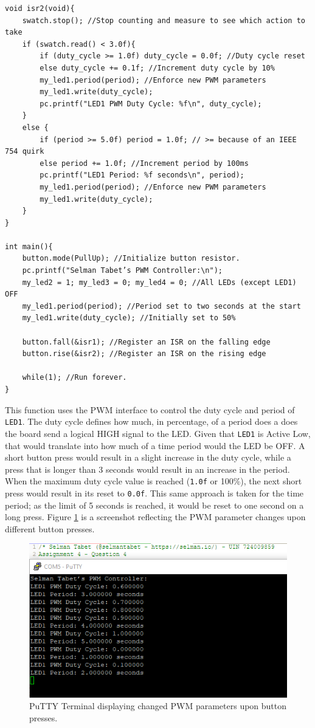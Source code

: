 \documentclass{article}
\begin{document}
\begin{verbatim}
void isr2(void){
    swatch.stop(); //Stop counting and measure to see which action to take
    if (swatch.read() < 3.0f){
        if (duty_cycle >= 1.0f) duty_cycle = 0.0f; //Duty cycle reset
        else duty_cycle += 0.1f; //Increment duty cycle by 10%
        my_led1.period(period); //Enforce new PWM parameters
        my_led1.write(duty_cycle);
        pc.printf("LED1 PWM Duty Cycle: %f\n", duty_cycle);
    }
    else {
        if (period >= 5.0f) period = 1.0f; // >= because of an IEEE 754 quirk
        else period += 1.0f; //Increment period by 100ms
        pc.printf("LED1 Period: %f seconds\n", period);
        my_led1.period(period); //Enforce new PWM parameters
        my_led1.write(duty_cycle);
    }
}

int main(){
    button.mode(PullUp); //Initialize button resistor.
    pc.printf("Selman Tabet’s PWM Controller:\n");
    my_led2 = 1; my_led3 = 0; my_led4 = 0; //All LEDs (except LED1) OFF
    my_led1.period(period); //Period set to two seconds at the start
    my_led1.write(duty_cycle); //Initially set to 50%
    
    button.fall(&isr1); //Register an ISR on the falling edge
    button.rise(&isr2); //Register an ISR on the rising edge
    
    while(1); //Run forever.
}
\end{verbatim}
\pagebreak

This function uses the PWM interface to control the duty cycle and period of \texttt{LED1}. The duty cycle defines how much, in percentage, of a period does a does the board send a logical HIGH signal to the LED. Given that \texttt{LED1} is Active Low, that would translate into how much of a time period would the LED be OFF. A short button press would result in a slight increase in the duty cycle, while a press that is longer than 3 seconds would result in an increase in the period. When the maximum duty cycle value is reached (\texttt{1.0f} or 100\%), the next short press would result in its reset to \texttt{0.0f}. This same approach is taken for the time period; as the limit of 5 seconds is reached, it would be reset to one second on a long press. Figure \ref{fig:q4} is a screenshot reflecting the PWM parameter changes upon different button presses.

\begin{figure}[!ht]
\begin{center}
\includegraphics{Figures/Q4.png}
\end{center}
\caption {PuTTY Terminal displaying changed PWM parameters upon button presses.}
\label{fig:q4}
\end{figure}
\end{document}
